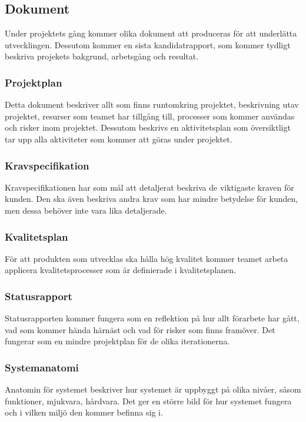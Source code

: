 \subsection{Dokument}
Under projektets gång kommer olika dokument att produceras för att underlätta utvecklingen.
Dessutom kommer en sista kandidatrapport, som kommer tydligt beskriva projekets bakgrund, arbetsgång och resultat.

\subsubsection*{Projektplan}
Detta dokument beskriver allt som finns runtomkring projektet, beskrivning utav projektet, 
resurser som teamet har tillgång till, processer som kommer användas och risker inom projektet.
Dessutom beskrivs en aktivitetsplan som översiktligt tar upp alla aktiviteter som kommer att
göras under projektet.

\subsubsection*{Kravspecifikation}
Kravspecifikationen har som mål att detaljerat beskriva de viktigaste kraven för kunden.
Den ska även beskriva andra krav som har mindre betydelse för kunden, men dessa behöver inte vara
lika detaljerade.

\subsubsection*{Kvalitetsplan}
För att produkten som utvecklas ska hålla hög kvalitet kommer teamet arbeta applicera kvalitetsprocesser som är definierade i kvalitetsplanen\cite{bib-kvalitetsplan}.

\subsubsection*{Statusrapport}
Statusrapporten kommer fungera som en reflektion på hur allt förarbete har gått, vad som kommer
hända härnäst och vad för risker som finns framöver. Det fungerar som en mindre projektplan för
de olika iterationerna.

\subsubsection*{Systemanatomi}
Anatomin för systemet beskriver hur systemet är uppbyggt på olika nivåer, såsom funktioner, 
mjukvara, hårdvara. Det ger en större bild för hur systemet fungera och i vilken miljö den kommer
befinna sig i.

